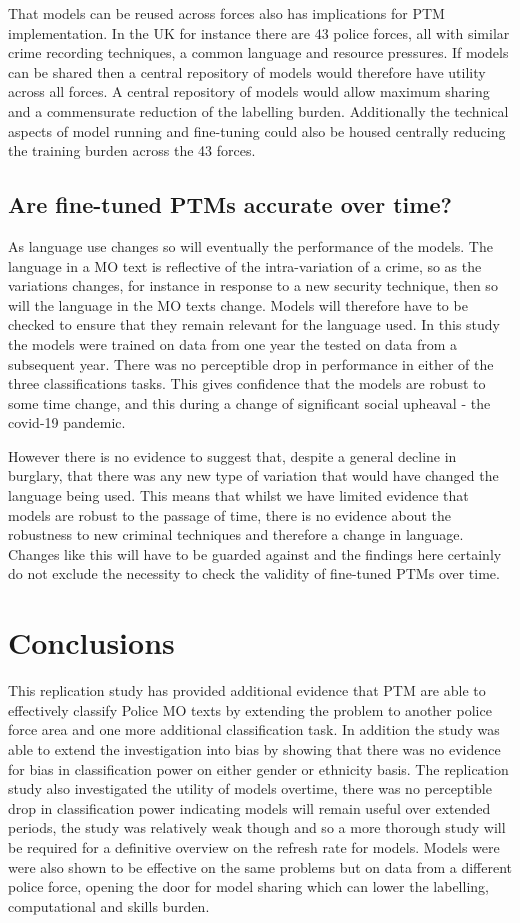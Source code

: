 That models can be reused across forces also has implications for PTM implementation. In the UK for instance there are 43 police forces, all with similar crime recording techniques, a common language and resource pressures. If models can be shared then a central repository of models would therefore have utility across all forces. A central repository of models would allow maximum sharing and a commensurate reduction of the labelling burden. Additionally the technical aspects of model running and fine-tuning could also be housed centrally reducing the training burden across the 43 forces.


\subsection{Are fine-tuned PTMs accurate over time?} As language use changes so will eventually the performance of the models. The language in a MO text is reflective of the intra-variation of a crime, so as the variations changes, for instance in response to a new security technique, then so will the language in the MO texts change. Models will therefore have to be checked to ensure that they remain relevant for the language used. In this study the models were trained on data from one year the tested on data from a subsequent year. There was no perceptible drop in performance in either of the three classifications tasks. This gives confidence that the models are robust to some time change, and this during a change of significant social upheaval - the covid-19 pandemic. 

However there is no evidence to suggest that, despite a general decline in burglary, that there was any new type of variation that would have changed the language being used. This means that whilst we have limited evidence that models are robust to the passage of time, there is no evidence about the robustness to new criminal techniques and therefore a change in language. Changes like this will have to be guarded against and the findings here certainly do not exclude the necessity to check the validity of fine-tuned PTMs over time.


\section{Conclusions}This replication study has provided additional evidence that PTM are able to effectively classify Police MO texts by extending the problem to another police force area and one more additional classification task. In addition the study was able to extend the investigation into bias by showing that there was no evidence for bias in classification power on either gender or ethnicity basis. The replication study also investigated the utility of models overtime, there was no perceptible drop in classification power indicating models will remain useful over extended periods, the study was relatively weak though and so a more thorough study will be required for a definitive overview on the refresh rate for models. Models were were also shown to be effective on the same problems but on data from a different police force, opening the door for model sharing which can lower the labelling, computational and skills burden. 

